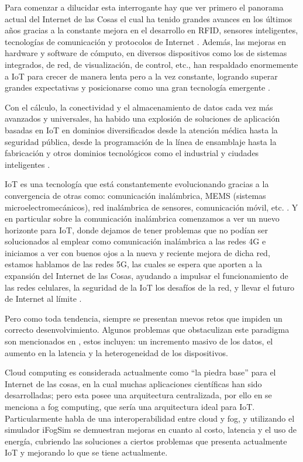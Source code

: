 \vskip 0.8cm
Para comenzar a dilucidar esta interrogante hay que ver primero el panorama actual del Internet de las Cosas el cual ha tenido grandes avances en los últimos años gracias a la constante mejora en el desarrollo en RFID, sensores inteligentes, tecnologías de comunicación y protocolos de Internet \citep{alfuqaha2015,borgia2014}. Además, las mejoras en hardware y software de cómputo, en diversos dispositivos como los de sistemas integrados, de red, de visualización, de control, etc., han respaldado enormemente a IoT para crecer de manera lenta pero a la vez constante, logrando superar grandes expectativas y posicionarse como una gran tecnología emergente \citep{vyas2017}.\par
\vskip 0.3cm
Con el cálculo, la conectividad y el almacenamiento de datos cada vez más avanzados y universales, ha habido una explosión de soluciones de aplicación basadas en IoT en dominios diversificados desde la atención médica hasta la seguridad pública, desde la programación de la línea de ensamblaje hasta la fabricación y otros dominios tecnológicos como el industrial y ciudades inteligentes \citep{borgia2014,vyas2017}.\par
\vskip 0.3cm
IoT es una tecnología que está constantemente evolucionando gracias a la convergencia de otras como: comunicación inalámbrica, MEMS (sistemas microelectromecánicos), red inalámbrica de sensores, comunicación móvil, etc. \citep{vyas2017}. Y en particular sobre la comunicación inalámbrica comenzamos a ver un nuevo horizonte para IoT, donde dejamos de tener problemas que no podían ser solucionados al emplear como comunicación inalámbrica a las redes 4G e iniciamos a ver con buenos ojos a la nueva y reciente mejora de dicha red, estamos hablamos de las redes 5G, las cuales se espera que aporten a la expansión del Internet de las Cosas, ayudando a impulsar el funcionamiento de las redes celulares, la seguridad de la IoT los desafíos de la red, y llevar el futuro de Internet al límite \citep{li2018}.\par
\vskip 0.3cm
Pero como toda tendencia, siempre se presentan nuevos retos que impiden un correcto desenvolvimiento. Algunos problemas que obstaculizan este paradigma son mencionados en \citep{borgia2014,ibrahim2015,mahumd2018}, estos incluyen: un incremento masivo de los datos, el aumento en la latencia y la heterogeneidad de los dispositivos.\par
\vskip 0.3cm
Cloud computing \citep{ibrahim2015} es considerada actualmente como “la piedra base” para el Internet de las cosas, en la cual muchas aplicaciones científicas han sido desarrolladas; pero esta posee una arquitectura centralizada, por ello en \citep{mahumd2018,patel2018,yi2015} se menciona a fog computing, que sería una arquitectura ideal para IoT. Particularmente \citep{mahumd2018} habla de una interoperabilidad entre cloud y fog, y utilizando el simulador iFogSim se demuestran mejoras en cuanto al costo, latencia y el uso de energía, cubriendo las soluciones a ciertos problemas que presenta actualmente IoT y mejorando lo que se tiene actualmente.\par
